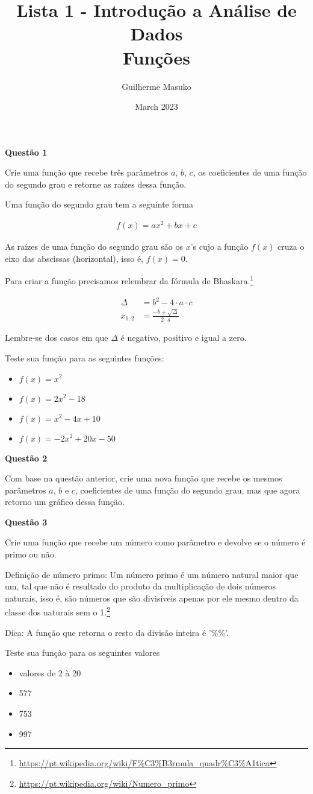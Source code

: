 \documentclass[12pt, a4paper]{article}
\title{Lista 1 - Introdução a Análise de Dados \\
Funções}
\author{Guilherme Masuko}
\date{March 2023}
\begin{document}
	
\clearpage
\maketitle
\thispagestyle{empty}

\textbf{Questão 1}

Crie uma função que recebe três parâmetros $a$, $b$, $c$, os coeficientes de uma função do segundo grau e retorne as raízes dessa função.

Uma função do segundo grau tem a seguinte forma 

\begin{align*}
	f(x) = ax^2 + bx + c
\end{align*}

As raízes de uma função do segundo grau são os $x$'s cujo a função $f(x)$ cruza o eixo das abscissas (horizontal), isso é, $f(x) = 0$.

Para criar a função precisamos relembrar da fórmula de Bhaskara.\footnote{\url{https://pt.wikipedia.org/wiki/F\%C3\%B3rmula_quadr\%C3\%A1tica}}

\begin{align*}
	\Delta &= b^2 -4\cdot a\cdot c \\
	x_{1,2} &= \frac{-b \pm \sqrt{\Delta}}{2\cdot a}
\end{align*}

Lembre-se dos casos em que $\Delta$ é negativo, positivo e igual a zero.

Teste sua função para as seguintes funções:

\begin{itemize}
	\item $f(x) = x^2$
	\item $f(x) = 2x^2 - 18$
	\item $f(x) = x^2 - 4x + 10$
	\item $f(x) = -2x^2 + 20x - 50$
\end{itemize}



\textbf{Questão 2}

Com base na questão anterior, crie uma nova função que recebe os mesmos parâmetros $a$, $b$ e $c$, coeficientes de uma função do segundo grau, mas que agora retorno um gráfico dessa função.



\textbf{Questão 3}

Crie uma função que recebe um número como parâmetro e devolve se o número é primo ou não.

Definição de número primo: Um número primo é um número natural maior que um, tal que não é resultado do produto da multiplicação de dois números naturais, isso é, são números que são divisíveis apenas por ele mesmo dentro da classe dos naturais sem o 1.\footnote{\url{https://pt.wikipedia.org/wiki/Numero_primo}}

Dica: A função que retorna o resto da divisão inteira é '\%\%'.

Teste sua função para os seguintes valores

\begin{itemize}
	\item valores de 2 à 20
	\item 577
	\item 753
	\item 997
\end{itemize}
\end{document}
